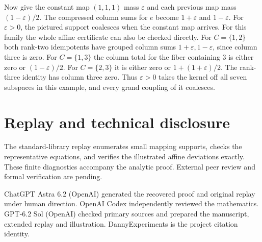 \documentclass[11pt,a4paper]{amsart}
\begin{document}
Now give the constant map $(1,1,1)$ mass $\varepsilon$ and each previous map mass $(1-\varepsilon)/2$. The compressed column sums for $e$ become $1+\varepsilon$ and $1-\varepsilon$. For $\varepsilon>0$, the pictured support coalesces when the constant map arrives. For this family the whole affine certificate can also be checked directly. For $C=\{1,2\}$ both rank-two idempotents have grouped column sums $1+\varepsilon,1-\varepsilon$, since column three is zero. For $C=\{1,3\}$ the column total for the fiber containing $3$ is either zero or $(1-\varepsilon)/2$. For $C=\{2,3\}$ it is either zero or $1+(1+\varepsilon)/2$. The rank-three identity has column three zero. Thus $\varepsilon>0$ takes the kernel off all seven subspaces in this example, and every grand coupling of it coalesces.

\section*{Replay and technical disclosure}
The standard-library replay enumerates small mapping supports, checks the representative equations, and verifies the illustrated affine deviations exactly. These finite diagnostics accompany the analytic proof. External peer review and formal verification are pending.

ChatGPT Astra 6.2 (OpenAI) generated the recovered proof and original replay under human direction. OpenAI Codex independently reviewed the mathematics. GPT-6.2 Sol (OpenAI) checked primary sources and prepared the manuscript, extended replay and illustration. DannyExperiments is the project citation identity.



\end{document}
